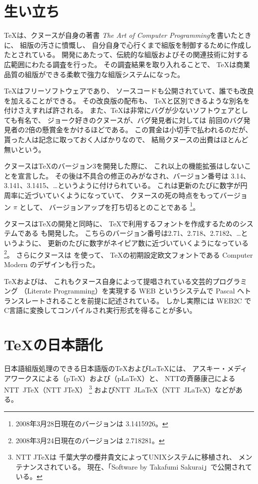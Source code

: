 \documentclass{jsarticle}
\begin{document}
\section{生い立ち}

\TeX は、クヌースが自身の著書
{\itshape The Art of Computer Programming\/}を書いたときに、
組版の汚さに憤慨し、
自分自身で心行くまで組版を制御するために作成したとされている。
開発にあたって、伝統的な組版およびその関連技術に対する
広範囲にわたる調査を行った。
その調査結果を取り入れることで、
\TeX は商業品質の組版ができる柔軟で強力な組版システムになった。

\TeX はフリーソフトウェアであり、
ソースコードも公開されていて、誰でも改良を加えることができる。
その改良版の配布も、
\TeX と区別できるような別名を付けさえすれば許される。
また、\TeX は非常にバグが少ないソフトウェアとしても有名で、
ジョーク好きのクヌースが、バグ発見者に対しては
前回のバグ発見者の2倍の懸賞金をかけるほどである。
この賞金は小切手で払われるのだが、
貰った人は記念に取っておく人ばかりなので、
結局クヌースの出費はほとんど無いという。

クヌースは\TeX のバージョン3を開発した際に、
これ以上の機能拡張はしないことを宣言した。
その後は不具合の修正のみがなされ、バージョン番号は
3.14、3.141、3.1415、\ldots というように付けられている。
これは更新のたびに数字が円周率に近づいていくようになっていて、
クヌースの死の時点をもってバージョン $\pi$ として、
バージョンアップを打ち切るとのことである%
\footnote{2008年3月28日現在のバージョンは 3.1415926。}。

クヌースは\TeX の開発と同時に、
\TeX で利用するフォントを作成するためのシステムである 
\MF も開発した。
こちらのバージョン番号は2.71、2.718、2.7182、\ldots というように、
更新のたびに数字がネイピア数に近づいていくようになっている%
\footnote{2008年3月24日現在のバージョンは 2.718281。}。
さらにクヌースは \MF を使って、
\TeX の初期設定欧文フォントである Computer Modern のデザインも行った。

\TeX および\MF は、
これもクヌース自身によって提唱されている文芸的プログラミング
（Literate Programming）を実現する WEB というシステムで 
Pascal へトランスレートされることを前提に記述されている。
しかし実際には WEB2C で 
C言語に変換してコンパイルされ実行形式を得ることが多い。

\section{\TeX の日本語化}

日本語組版処理のできる日本語版の\TeX および\LaTeX には、
アスキー・メディアワークスによる\pTeX（pTeX）および\pLaTeX（pLaTeX）と、
NTTの斉藤康己によるNTT~J\TeX（NTT JTeX）%
\footnote{NTT J\TeX は
千葉大学の櫻井貴文によってUNIXシステムに移植され、
メンテナンスされている。
現在、「Software by Takafumi Sakurai」で公開されている。}%
およびNTT~J\LaTeX（NTT~JLaTeX）などがある。
\end{document}
